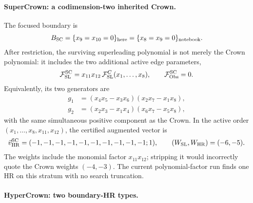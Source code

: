 \documentclass[a4paper,11pt]{article}
\newcommand{\WSL}{W_{\rm SL}}
\newcommand{\WHR}{W_{\rm HR}}
\newcommand{\vHR}{\vec v_{\rm HR}}
\begin{document}
\paragraph{SuperCrown: a codimension-two inherited Crown.}

The focused boundary is
\begin{equation}
 B_{\rm SC}=\{x_9=x_{10}=0\}_{\rm here}
 =\{x_8=x_9=0\}_{\rm notebook}.
 \label{eq:SC-boundary}
\end{equation}
After restriction, the surviving superleading polynomial is not merely the
Crown polynomial: it includes the two additional active edge parameters,
\begin{equation}
 \mathcal F_{\rm SL}^{\rm SC}
 =x_{11}x_{12}\,\mathcal F_{\rm SL}^{C}(x_1,\ldots,x_8),
 \qquad \mathcal F_{\rm Obs}^{\rm SC}=0.
 \label{eq:SC-decomposition}
\end{equation}
Equivalently, its two generators are
\begin{align}
 g_1&=(x_4x_5-x_3x_6)(x_2x_7-x_1x_8),\\
 g_2&=(x_2x_3-x_1x_4)(x_6x_7-x_5x_8),
 \label{eq:SC-generators}
\end{align}
with the same simultaneous positive component as the Crown.  In the active
order \((x_1,\ldots,x_8,x_{11},x_{12})\), the certified augmented vector is
\begin{equation}
 \vHR^{\rm SC}=(-1,-1,-1,-1,-1,-1,-1,-1,-1,-1;1),
 \qquad (\WSL,\WHR)=(-6,-5).
 \label{eq:SC-vector}
\end{equation}
The weights include the monomial factor \(x_{11}x_{12}\); stripping it would
incorrectly quote the Crown weights \((-4,-3)\).  The current polynomial-factor
run finds one HR on this stratum with no search truncation.

\paragraph{HyperCrown: two boundary-HR types.}
\end{document}
